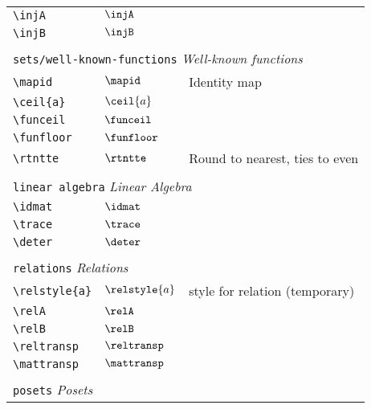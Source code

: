 \begin{longtable}{lll}
 {\color[rgb]{0.5,0.5,0.5}\texttt{\textbackslash injA}} & $\injA$ & \\ 
 {\color[rgb]{0.5,0.5,0.5}\texttt{\textbackslash injB}} & $\injB$ & \\ 
  &  & \\ 
 \multicolumn{3}{l}{{\color[rgb]{0.5,0.5,0.5}\texttt{sets/well-known-functions}} \emph{Well-known functions}}\\ 
 \hline
{\color[rgb]{0.5,0.5,0.5}\texttt{\textbackslash mapid}} & $\mapid$ &  Identity map\\ 
 {\color[rgb]{0.5,0.5,0.5}\texttt{\textbackslash ceil\{a\}}} & $\ceil{a}$ & \\ 
 {\color[rgb]{0.5,0.5,0.5}\texttt{\textbackslash funceil}} & $\funceil$ & \\ 
 {\color[rgb]{0.5,0.5,0.5}\texttt{\textbackslash funfloor}} & $\funfloor$ & \\ 
 {\color[rgb]{0.5,0.5,0.5}\texttt{\textbackslash rtntte}} & $\rtntte$ &  Round to nearest, ties to even\\ 
  &  & \\ 
 \multicolumn{3}{l}{{\color[rgb]{0.5,0.5,0.5}\texttt{linear algebra}} \emph{Linear Algebra}}\\ 
 \hline
\hline
{\color[rgb]{0.5,0.5,0.5}\texttt{\textbackslash idmat}} & $\idmat$ & \\ 
 {\color[rgb]{0.5,0.5,0.5}\texttt{\textbackslash trace}} & $\trace$ & \\ 
 {\color[rgb]{0.5,0.5,0.5}\texttt{\textbackslash deter}} & $\deter$ & \\ 
  &  & \\ 
 \multicolumn{3}{l}{{\color[rgb]{0.5,0.5,0.5}\texttt{relations}} \emph{Relations}}\\ 
 \hline
\hline
{\color[rgb]{0.5,0.5,0.5}\texttt{\textbackslash relstyle\{a\}}} & $\relstyle{a}$ &  style for relation (temporary)\\ 
 {\color[rgb]{0.5,0.5,0.5}\texttt{\textbackslash relA}} & $\relA$ & \\ 
 {\color[rgb]{0.5,0.5,0.5}\texttt{\textbackslash relB}} & $\relB$ & \\ 
 {\color[rgb]{0.5,0.5,0.5}\texttt{\textbackslash reltransp}} & $\reltransp$ & \\ 
 {\color[rgb]{0.5,0.5,0.5}\texttt{\textbackslash mattransp}} & $\mattransp$ & \\ 
  &  & \\ 
 \multicolumn{3}{l}{{\color[rgb]{0.5,0.5,0.5}\texttt{posets}} \emph{Posets}}\\ 
 \hline

\end{longtable}
